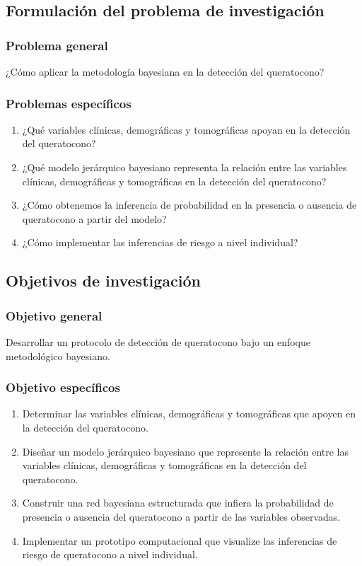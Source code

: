 \subsection{Formulación del problema de investigación}
\subsubsection{Problema general}
¿Cómo aplicar la metodología bayesiana en la detección del queratocono?

\subsubsection{Problemas específicos}
\begin{enumerate}
\item ¿Qué variables clínicas, demográficas y tomográficas apoyan en la detección del queratocono?
\item ¿Qué modelo jerárquico bayesiano representa la relación entre las variables clínicas, demográficas y tomográficas en la detección del queratocono?
\item ¿Cómo obtenemos la inferencia de probabilidad en la presencia o ausencia de queratocono a partir del modelo?
\item ¿Cómo implementar las inferencias de riesgo a nivel individual?
\end{enumerate}


\subsection{Objetivos de investigación}
\subsubsection{Objetivo general}
Desarrollar un protocolo de detección de queratocono bajo un enfoque metodológico bayesiano.

\subsubsection{Objetivo específicos}
\begin{enumerate}
\item Determinar las variables clínicas, demográficas y tomográficas que apoyen en la detección del queratocono.
\item Diseñar un modelo jerárquico bayesiano que represente la relación entre las variables clínicas, demográficas y tomográficas en la detección del queratocono.
\item Construir una red bayesiana estructurada que infiera la probabilidad de presencia o ausencia del queratocono a partir de las variables observadas.
\item Implementar un prototipo computacional que visualize las inferencias de riesgo de queratocono a nivel individual.
\end{enumerate}

